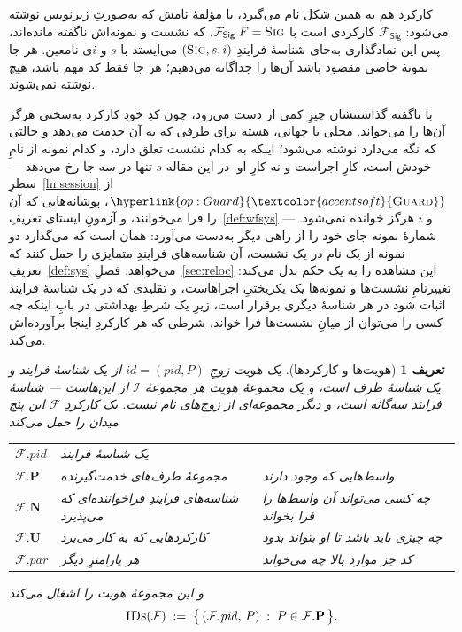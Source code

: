 \documentclass[10pt,oneside,openany]{book}
\newcommand{\Ps}{\mathbf{P}}
\newcommand{\PID}{\mathit{pid}}
\newcommand{\admits}{\mathbf{N}}
\newcommand{\pars}{\mathit{par}}
\newcommand{\uses}{\mathbf{U}}
\newcommand{\F}{\mathcal{F}}
\newcommand{\op}[1]{\textnormal{\textsc{#1}}}
\newcommand{\opl}[1]{\hyperlink{op:#1}{\textcolor{accentsoft}{\op{#1}}}}
\newcommand{\IDs}{\op{IDs}}
\newcommand{\Ids}{\mathcal{I}}
\newcommand{\id}{id}
\newcommand{\Fsig}{\mathcal{F}_{\mathsf{Sig}}}
\theoremstyle{accentdef}
\newtheorem{definition}{تعریف}[chapter]
\theoremstyle{accentplain}
\begin{document}
کارکرد هم به همین شکل نام می‌گیرد، با مؤلفهٔ نامش که به‌صورتِ زیرنویس
نوشته می‌شود: $\Fsig$ کارکردی است با $\Fsig.F = \op{Sig}$، که نشست و
نمونه‌اش ناگفته مانده‌اند، پس این نمادگذاری به‌جای شناسهٔ فرایندِ
$(\op{Sig},s,i)$ می‌ایستد با $s$ و $i$ی نامعین. هر جا نمونهٔ خاصی مقصود
باشد آن‌ها را جداگانه می‌دهیم؛ هر جا فقط کد مهم باشد، هیچ نوشته
نمی‌شوند.

با ناگفته گذاشتنشان چیزِ کمی از دست می‌رود، چون کدِ خودِ کارکرد به‌سختی
هرگز آن‌ها را می‌خواند. محلی یا جهانی، هسته برای طرفی که به آن خدمت
می‌دهد و حالتی که نگه می‌دارد نوشته می‌شود؛ اینکه به کدام نشست تعلق دارد،
و کدام نمونه از نامِ خودش است، کارِ اجراست و نه کارِ او. در این مقاله $s$
تنها در سه جا رخ می‌دهد --- سطرِ~\ref{ln:session} از $\opl{Guard}$،
پوشانه‌هایی که آن را فرا می‌خوانند، و آزمونِ ایستای تعریفِ~\ref{def:wfsys}
--- و $i$ هرگز خوانده نمی‌شود. شمارهٔ نمونه جای خود را از راهی دیگر
به‌دست می‌آورد: همان است که می‌گذارد دو نمونه از یک نام در یک نشست، آن
شناسه‌های فرایندِ متمایزی را حمل کنند که تعریفِ~\ref{def:sys} می‌خواهد.
فصلِ~\ref{sec:reloc} این مشاهده را به یک حکم بدل می‌کند: تغییرنامِ نشست‌ها
و نمونه‌ها یک یکریختیِ اجراهاست، و تقلیدی که در یک شناسهٔ فرایند اثبات
شود در هر شناسهٔ دیگری برقرار است، زیرِ یک شرطِ بهداشتی در بابِ اینکه چه
کسی را می‌توان از میانِ نشست‌ها فرا خواند، شرطی که هر کارکردِ اینجا
برآورده‌اش می‌کند.

\begingroup{}
\begin{definition}[هویت‌ها و کارکردها]\label{def:func}
یک \emph{هویت} زوجِ $\id = (\PID,P)$ از یک شناسهٔ فرایند و یک شناسهٔ طرف
است، و یک \emph{مجموعهٔ هویت} هر مجموعهٔ $\Ids$ از این‌هاست --- شناسهٔ
فرایند سه‌گانه است، و دیگر مجموعه‌ای از زوج‌های نام نیست. یک
\emph{کارکردِ} $\F$ این پنج میدان را حمل می‌کند
\begin{center}
\footnotesize
\begin{tabular}{@{}ll l@{}}
\toprule
$\F.\PID$   & یک شناسهٔ فرایند                       & \\
$\F.\Ps$    & مجموعهٔ طرف‌های \emph{خدمت‌گیرنده}       & واسط‌هایی که وجود دارند \\
$\F.\admits$  & شناسه‌های فرایندِ فراخواننده‌ای که می‌پذیرد & چه کسی می‌تواند آن واسط‌ها را فرا بخواند \\
$\F.\uses$  & کارکردهایی که \emph{به کار می‌برد}      & چه چیزی باید باشد تا او بتواند بدود \\
$\F.\pars$  & هر پارامترِ دیگر                       & کد جز موارد بالا چه می‌خواند \\
\bottomrule
\end{tabular}
\end{center}
و این مجموعهٔ هویت را \emph{اشغال می‌کند}
\[
  \IDs(\F) \;:=\; \bigl\{\, (\F.\PID,\, P) \;:\; P \in \F.\Ps \,\bigr\} .
\]
\end{definition}
\endgroup
\end{document}
